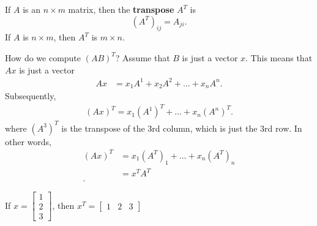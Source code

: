 
\begin{definition}
	If \( A \) is an \( n\times m \) matrix, then the \textbf{transpose} \( A^{T}  \) is \[
		(A^{T})_{ij} =  A_{ji}
	.\] 
	If \( A \) is \( n\times m \), then \( A^{T}  \) is \( m\times n \).
\end{definition}

How do we compute \( (AB)^{T}  \)? Assume that \( B \) is just a vector \( x \). This means that \( Ax \) is just a vector
\begin{align*}
	Ax &= x_{1}A^{1}+x_{2}A^{2} + \ldots  + x_n A^{n}
.\end{align*} Subsequently, 
\begin{align*}
	(Ax)^{T} = x_{1}(A^{1} )^{T} + \ldots + x_{n}(A^{n} )^{T} 
.\end{align*}
where \( (A^{3} )^{T}  \) is the transpose of the 3rd column, which is just the 3rd row. In other words, 
\begin{align*}
	(Ax)^{T} &= x_{1}(A^{T} )_{1} + \ldots + x_{n}(A^{T} )_{n}  \\
	&= x^{T}A^{T}   \\
.\end{align*}

\begin{eg}
	If \( x = \begin{bmatrix}
		1 \\ 2 \\ 3
	\end{bmatrix} \), then \( x^{T} = \begin{bmatrix}
	1 & 2 & 3
	\end{bmatrix}  \)
\end{eg}
